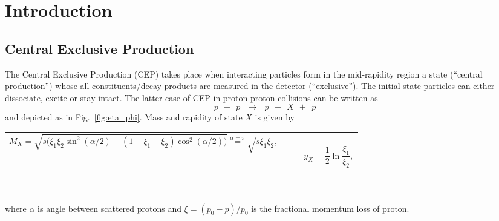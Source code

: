 

\chapter{Introduction}\label{chap:introduction}

\section{Central Exclusive Production}
The Central Exclusive Production (CEP) takes place when interacting particles form in the mid-rapidity region a state (``central production'') whose all constituents/decay products are measured in the detector (``exclusive''). The initial state particles can either dissociate, excite or stay intact. The latter case of CEP in proton-proton collisions can be written as
\begin{equation}\label{eq:cep}%
p~~+~~p~~~\rightarrow~~~p~~+~~X~~+~~p
\end{equation}
and depicted as in Fig.~\ref{fig:eta_phi}. Mass and rapidity of state $X$ is given by\\[-10pt]
\begin{tabulary}{\textwidth}{CCR}
\begin{equation}\label{eq:mass_X}
M_{X} = \sqrt{s\Big(\xi_{1}\xi_{2}\sin^{2}{(\alpha/2)}-(1-\xi_{1}-\xi_{2})\cos^{2}{(\alpha/2)}\Big)} \stackrel{\alpha=\pi}{=} \sqrt{s\xi_{1}\xi_{2}},
\end{equation}~~~~~~~~~~~~~~~~ & ~~ & ~~~~~~
\begin{equation}\label{eq:rapidity_X}
y_{X} = \frac{1}{2}\ln{\frac{\xi_{1}}{\xi_{2}}},
\end{equation}~~~~~~~~
\end{tabulary}\\[-10pt]
where $\alpha$ is angle between scattered protons and $\xi=(p_{0}-p)/p_{0}$ is the fractional momentum loss of proton.\vspace{-5pt}

